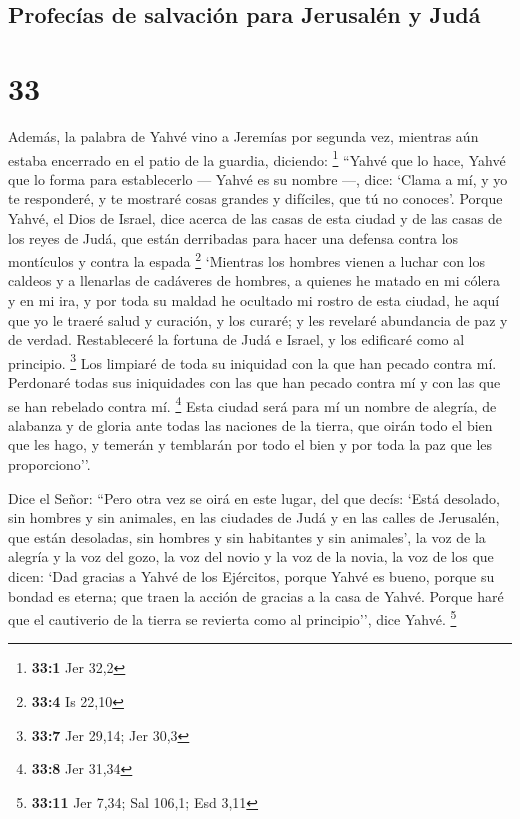 \hypertarget{profecuxedas-de-salvaciuxf3n-para-jerusaluxe9n-y-juduxe1}{%
\subsection{Profecías de salvación para Jerusalén y
Judá}\label{profecuxedas-de-salvaciuxf3n-para-jerusaluxe9n-y-juduxe1}}

\hypertarget{section-32}{%
\section{33}\label{section-32}}

 Además, la palabra de Yahvé vino a Jeremías por segunda
vez, mientras aún estaba encerrado en el patio de la guardia, diciendo:
\footnote{\textbf{33:1} Jer 32,2}  ``Yahvé que lo hace,
Yahvé que lo forma para establecerlo --- Yahvé es su nombre ---, dice:
 `Clama a mí, y yo te responderé, y te mostraré cosas
grandes y difíciles, que tú no conoces'.  Porque Yahvé, el
Dios de Israel, dice acerca de las casas de esta ciudad y de las casas
de los reyes de Judá, que están derribadas para hacer una defensa contra
los montículos y contra la espada \footnote{\textbf{33:4} Is 22,10}
 `Mientras los hombres vienen a luchar con los caldeos y a
llenarlas de cadáveres de hombres, a quienes he matado en mi cólera y en
mi ira, y por toda su maldad he ocultado mi rostro de esta ciudad,
 he aquí que yo le traeré salud y curación, y los curaré;
y les revelaré abundancia de paz y de verdad. 
Restableceré la fortuna de Judá e Israel, y los edificaré como al
principio. \footnote{\textbf{33:7} Jer 29,14; Jer 30,3} 
Los limpiaré de toda su iniquidad con la que han pecado contra mí.
Perdonaré todas sus iniquidades con las que han pecado contra mí y con
las que se han rebelado contra mí. \footnote{\textbf{33:8} Jer 31,34}
 Esta ciudad será para mí un nombre de alegría, de
alabanza y de gloria ante todas las naciones de la tierra, que oirán
todo el bien que les hago, y temerán y temblarán por todo el bien y por
toda la paz que les proporciono''.

 Dice el Señor: ``Pero otra vez se oirá en este lugar,
del que decís: `Está desolado, sin hombres y sin animales, en las
ciudades de Judá y en las calles de Jerusalén, que están desoladas, sin
hombres y sin habitantes y sin animales',  la voz de la
alegría y la voz del gozo, la voz del novio y la voz de la novia, la voz
de los que dicen: `Dad gracias a Yahvé de los Ejércitos, porque Yahvé es
bueno, porque su bondad es eterna; que traen la acción de gracias a la
casa de Yahvé. Porque haré que el cautiverio de la tierra se revierta
como al principio'', dice Yahvé. \footnote{\textbf{33:11} Jer 7,34; Sal
  106,1; Esd 3,11}

